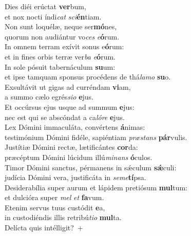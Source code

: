 \evenverse Dies diéi erúctat \textbf{ver}bum,~\*\\
\evenverse et nox nocti índi\textit{cat} \textit{sci}\textbf{én}tiam.\\
\oddverse Non sunt loquélæ, neque ser\textbf{mó}nes,~\*\\
\oddverse quorum non audiántur vo\textit{ces} \textit{e}\textbf{ó}rum.\\
\evenverse In omnem terram exívit sonus e\textbf{ó}rum:~\*\\
\evenverse et in fines orbis terræ ver\textit{ba} \textit{e}\textbf{ó}rum.\\
\oddverse In sole pósuit tabernáculum \textbf{su}um:~\*\\
\oddverse et ipse tamquam sponsus procédens de thá\textit{la}\textit{mo} \textbf{su}o.\\
\evenverse Exsultávit ut gigas ad curréndam \textbf{vi}am,~\*\\
\evenverse a summo cælo egrés\textit{si}\textit{o} \textbf{e}jus.\\
\oddverse Et occúrsus ejus usque ad summum \textbf{e}jus:~\*\\
\oddverse nec est qui se abscóndat a ca\textit{ló}\textit{re} \textbf{e}jus.\\
\evenverse Lex Dómini immaculáta, convértens \textbf{á}nimas:~\*\\
\evenverse testimónium Dómini fidéle, sapiéntiam \textit{præ}\textit{stans} \textbf{pár}vulis.\\
\oddverse Justítiæ Dómini rectæ, lætificántes \textbf{cor}da:~\*\\
\oddverse præcéptum Dómini lúcidum illú\textit{mi}\textit{nans} \textbf{ó}culos.\\
\evenverse Timor Dómini sanctus, pérmanens in sǽculum \textbf{sǽ}culi:~\*\\
\evenverse judícia Dómini vera, justificáta in \textit{se}\textit{me}\textbf{tí}psa.\\
\oddverse Desiderabília super aurum et lápidem pretiósum \textbf{mul}tum:~\*\\
\oddverse et dulcióra super \textit{mel} \textit{et} \textbf{fa}vum.\\
\evenverse Etenim servus tuus custódit \textbf{e}a,~\*\\
\evenverse in custodiéndis illis retribú\textit{ti}\textit{o} \textbf{mul}ta.\\
\oddverse Delícta quis intélligit?~+\\
